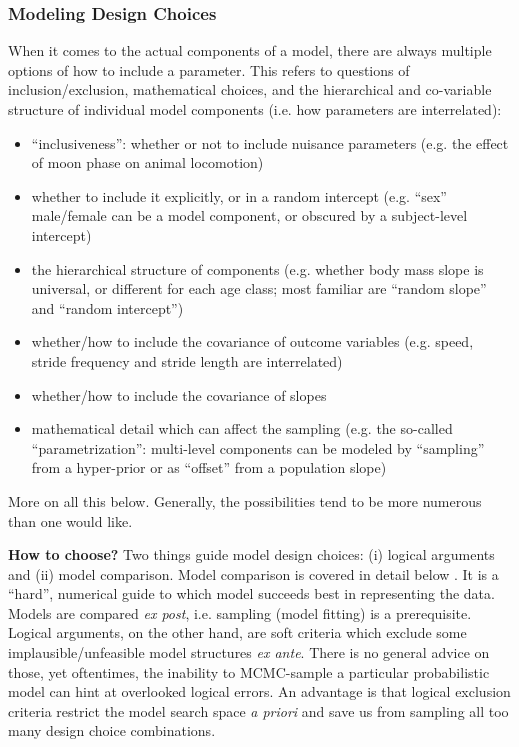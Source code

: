 \subsubsection{Modeling Design Choices}
\label{workflow:design:philosophy}
When it comes to the actual components of a model, there are always multiple options of how to include a parameter.
This refers to questions of inclusion/exclusion, mathematical choices, and the hierarchical and co-variable structure of individual model components (i.e. how parameters are interrelated):
\begin{itemize}
\item ``inclusiveness'': whether or not to include nuisance parameters (e.g. the effect of moon phase on animal locomotion)
\item whether to include it explicitly, or in a random intercept (e.g. ``sex'' male/female can be a model component, or obscured by a subject-level intercept)
\item the hierarchical structure of components (e.g. whether body mass slope is universal, or different for each age class; most familiar are ``random slope'' and ``random intercept'')
\item whether/how to include the covariance of outcome variables (e.g. speed, stride frequency and stride length are interrelated)
\item whether/how to include the covariance of slopes
\item mathematical detail which can affect the sampling (e.g. the so-called ``parametrization'': multi-level components can be modeled by ``sampling'' from a hyper-prior or as ``offset'' from a population slope)
\end{itemize}

More on all this below.
Generally, the possibilities tend to be more numerous than one would like.

\textbf{How to choose?} Two things guide model design choices: (i) logical arguments and (ii) model comparison.
Model comparison is covered in detail below .
It is a ``hard'', numerical guide to which model succeeds best in representing the data.
Models are compared \emph{ex post}, i.e. sampling (model fitting) is a prerequisite.
Logical arguments, on the other hand, are soft criteria which exclude some implausible/unfeasible model structures \emph{ex ante}.
There is no general advice on those, yet oftentimes, the inability to MCMC-sample a particular probabilistic model can hint at overlooked logical errors.
An advantage is that logical exclusion criteria restrict the model search space \emph{a priori} and save us from sampling all too many design choice combinations.


